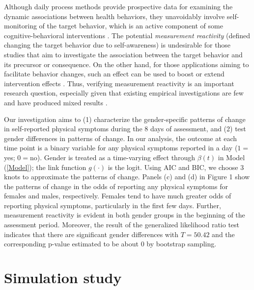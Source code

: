 Although daily process methods provide prospective data for
examining the dynamic associations between health behaviors, they
unavoidably involve self-monitoring of the target behavior, which
is an active component of some cognitive-behavioral interventions
\cite{simpson05}. The potential \emph{measurement reactivity}
(defined changing the target behavior due to self-awareness) is
undesirable for those studies that aim to investigate the
association between the target behavior and its precursor or
consequence. On the other hand, for those applications aiming to
facilitate behavior changes, such an effect can be used to boost
or extend intervention effects \cite{tucker12}. Thus, verifying
measurement reactivity is an important research question,
especially given that existing empirical investigations are few
and have produced mixed results \cite{barta12,stritzke05}.

Our investigation aims to (1) characterize the gender-specific
patterns of change in self-reported physical symptoms during the 8
days of assessment, and (2) test gender differences in patterns of
change. In our analysis, the outcome at each time point is a
binary variable for any physical symptoms reported in a day
($1=$yes; $0=$no). Gender is treated as a time-varying effect
through $\beta(t)$ in Model (\ref{Model}); the link function
$g(\cdot)$ is the logit. Using AIC and BIC, we choose 3 knots to
approximate the patterns of change. Panels (c) and (d) in Figure 1
show the patterns of change in the odds of reporting any physical
symptoms for females and males, respectively. Females tend to have
much greater odds of reporting physical symptoms, particularly in
the first few days. Further, measurement reactivity is evident in
both gender groups in the beginning of the assessment period.
Moreover, the result of the generalized likelihood ratio test
indicates that there are significant gender differences with
$T=50.42$ and the corresponding p-value estimated to be about $0$
by bootstrap sampling.


\section{Simulation study}

